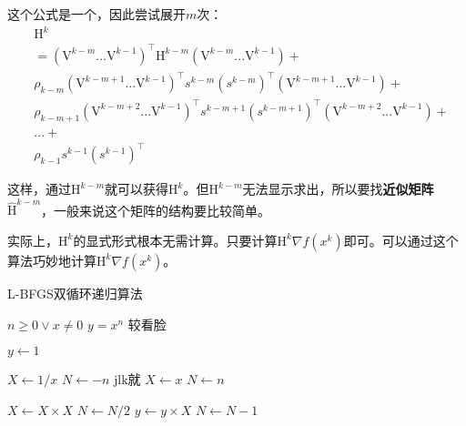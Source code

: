 \documentclass[a4paper]{D:/repositories/MyDGP/latex/PaperReadingLog}
\begin{document}
这个公式是一个，因此尝试展开$m$次：
$$
\begin{aligned}
   &\mathrm{H}^k\\
   &=(\mathrm{V}^{k-m}...\mathrm{V}^{k-1})^\top \mathrm{H}^{k-m}(\mathrm{V}^{k-m}...\mathrm{V}^{k-1})+\\
   &\rho_{k-m}(\mathrm{V}^{k-m+1}...\mathrm{V}^{k-1})^\top s^{k-m}(s^{k-m})^\top (\mathrm{V}^{k-m+1}...\mathrm{V}^{k-1})+\\
   &\rho_{k-m+1}(\mathrm{V}^{k-m+2}...\mathrm{V}^{k-1})^\top s^{k-m+1}(s^{k-m+1})^\top (\mathrm{V}^{k-m+2}...\mathrm{V}^{k-1})+\\
   &...+\\
   &\rho_{k-1}s^{k-1}(s^{k-1})^\top
\end{aligned}
$$

这样，通过$\mathrm{H}^{k-m}$就可以获得$\mathrm{H}^k$。但$\mathrm{H}^{k-m}$无法显示求出，所以要找\textbf{近似矩阵}$\hat{\mathrm{H}}^{k-m}$，一般来说这个矩阵的结构要比较简单。

实际上，$\mathrm{H}^k$的显式形式根本无需计算。只要计算$\mathrm{H}^k\nabla f(x^k)$即可。可以通过这个算法巧妙地计算$\mathrm{H}^k\nabla f(x^k)$。

\begin{algorithm}[H]
	\caption{L-BFGS双循环递归算法} 
	\begin{algorithmic}
		\REQUIRE $n \geq 0 \vee x \neq 0$ 
		\ENSURE $y = x^n$  较看脸
		
		\STATE $y \leftarrow 1$ 
		
			\STATE $X \leftarrow 1 / x$ 
			\STATE $N \leftarrow -n$  jlk就
		\ELSE 
			\STATE $X \leftarrow x$ 
			\STATE $N \leftarrow n$
		\ENDIF
		
				\STATE $X \leftarrow X \times X$ 
				\STATE $N \leftarrow N / 2$ 
				\STATE $y \leftarrow y \times X$ 
				\STATE $N \leftarrow N - 1$ 
			\ENDIF 
		\ENDWHILE
	\end{algorithmic}
\end{algorithm}
\end{document}
